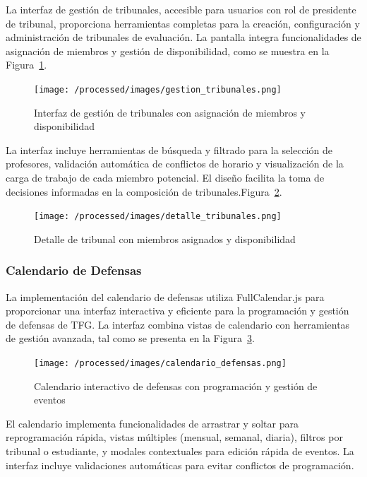 \documentclass[12pt,a4paper,oneside]{report}
\begin{document}
La interfaz de gestión de tribunales, accesible para usuarios con rol de presidente de tribunal, proporciona herramientas completas para la creación, configuración y administración de tribunales de evaluación. La pantalla integra funcionalidades de asignación de miembros y gestión de disponibilidad, como se muestra en la Figura~\ref{fig:gestion-tribunales}.

\begin{figure}[H]
\centering
\texttt{[image: /processed/images/gestion\_tribunales.png]}
\caption{Interfaz de gestión de tribunales con asignación de miembros y disponibilidad}
\label{fig:gestion-tribunales}
\end{figure}

La interfaz incluye herramientas de búsqueda y filtrado para la selección de profesores, validación automática de conflictos de horario y visualización de la carga de trabajo de cada miembro potencial. El diseño facilita la toma de decisiones informadas en la composición de tribunales.Figura~\ref{fig:detalle-tribunales}.

\begin{figure}[H]
\centering
\texttt{[image: /processed/images/detalle\_tribunales.png]}
\caption{Detalle de tribunal con miembros asignados y disponibilidad}
\label{fig:detalle-tribunales}
\end{figure}

\subsubsection{Calendario de Defensas}\label{calendario-de-defensas}

La implementación del calendario de defensas utiliza FullCalendar.js para proporcionar una interfaz interactiva y eficiente para la programación y gestión de defensas de TFG. La interfaz combina vistas de calendario con herramientas de gestión avanzada, tal como se presenta en la Figura~\ref{fig:calendario-defensas}.

\begin{figure}[H]
\centering
\texttt{[image: /processed/images/calendario\_defensas.png]}
\caption{Calendario interactivo de defensas con programación y gestión de eventos}
\label{fig:calendario-defensas}
\end{figure}

El calendario implementa funcionalidades de arrastrar y soltar para reprogramación rápida, vistas múltiples (mensual, semanal, diaria), filtros por tribunal o estudiante, y modales contextuales para edición rápida de eventos. La interfaz incluye validaciones automáticas para evitar conflictos de programación.
\end{document}
